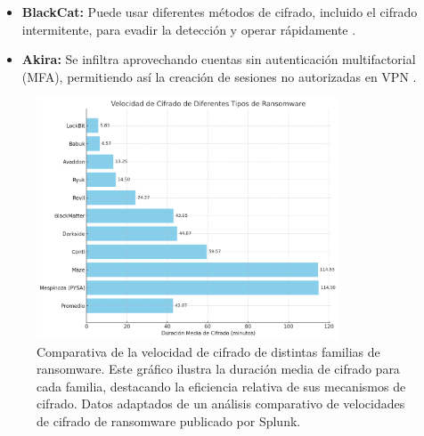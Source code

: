 \begin{itemize}
    \item \textbf{BlackCat:} Puede usar diferentes métodos de cifrado, incluido el cifrado intermitente, para evadir la detección y operar rápidamente \autocite{JDRRCiberseguridad2022}.
    \item \textbf{Akira:} Se infiltra aprovechando cuentas sin autenticación multifactorial (MFA), permitiendo así la creación de sesiones no autorizadas en VPN \autocite{Jaramillo2023}.
\end{itemize}





\begin{figure}[H]
    \centering
    \includegraphics[width=0.8\textwidth]{imagenes/graficos/velocidad_cifrado.png} %
    \caption{Comparativa de la velocidad de cifrado de distintas familias de ransomware. Este gráfico ilustra la duración media de cifrado para cada familia, destacando la eficiencia relativa de sus mecanismos de cifrado. Datos adaptados de un análisis comparativo de velocidades de cifrado de ransomware publicado por Splunk.\autocite{SplunkRansomwareSpeed}}
    \label{fig:mi-grafico}
\end{figure}